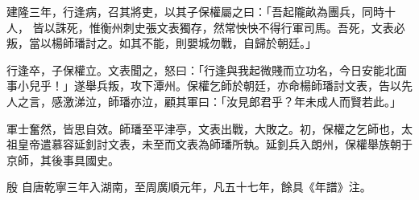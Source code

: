 \begin{pinyinscope}
 建隆三年，行逢病，召其將吏，以其子保權屬之曰：「吾起隴畝為團兵，同時十人，
 皆以誅死，惟衡州刺史張文表獨存，然常怏怏不得行軍司馬。吾死，文表必叛，當以楊師璠討之。如其不能，則嬰城勿戰，自歸於朝廷。」



 行逢卒，子保權立。文表聞之，怒曰：「行逢與我起微賤而立功名，今日安能北面事小兒乎！」遂舉兵叛，攻下潭州。保權乞師於朝廷，亦命楊師璠討文表，告以先人之言，感激涕泣，師璠亦泣，顧其軍曰：「汝見郎君乎？年未成人而賢若此。」



 軍士奮然，皆思自效。師璠至平津亭，文表出戰，大敗之。初，保權之乞師也，太祖皇帝遣慕容延釗討文表，未至而文表為師璠所執。延釗兵入朗州，保權舉族朝于京師，其後事具國史。



 殷
 自唐乾寧三年入湖南，至周廣順元年，凡五十七年，餘具《年譜》注。



\end{pinyinscope}